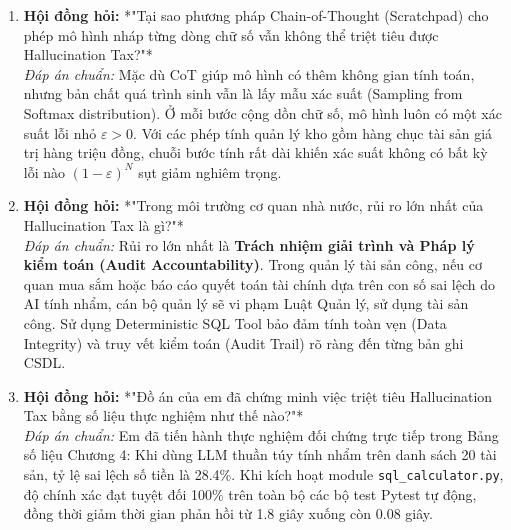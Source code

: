 \documentclass[11pt,a4paper]{article}
\begin{document}
\begin{deepdivebox}
\begin{enumerate}[leftmargin=1.5em]
    \item \textbf{Hội đồng hỏi:} *"Tại sao phương pháp Chain-of-Thought (Scratchpad) cho phép mô hình nháp từng dòng chữ số vẫn không thể triệt tiêu được Hallucination Tax?"*\\
    \textit{Đáp án chuẩn:} Mặc dù CoT giúp mô hình có thêm không gian tính toán, nhưng bản chất quá trình sinh vẫn là lấy mẫu xác suất (Sampling from Softmax distribution). Ở mỗi bước cộng dồn chữ số, mô hình luôn có một xác suất lỗi nhỏ $\varepsilon > 0$. Với các phép tính quản lý kho gồm hàng chục tài sản giá trị hàng triệu đồng, chuỗi bước tính rất dài khiến xác suất không có bất kỳ lỗi nào $(1-\varepsilon)^N$ sụt giảm nghiêm trọng.
    
    \item \textbf{Hội đồng hỏi:} *"Trong môi trường cơ quan nhà nước, rủi ro lớn nhất của Hallucination Tax là gì?"*\\
    \textit{Đáp án chuẩn:} Rủi ro lớn nhất là \textbf{Trách nhiệm giải trình và Pháp lý kiểm toán (Audit Accountability)}. Trong quản lý tài sản công, nếu cơ quan mua sắm hoặc báo cáo quyết toán tài chính dựa trên con số sai lệch do AI tính nhẩm, cán bộ quản lý sẽ vi phạm Luật Quản lý, sử dụng tài sản công. Sử dụng Deterministic SQL Tool bảo đảm tính toàn vẹn (Data Integrity) và truy vết kiểm toán (Audit Trail) rõ ràng đến từng bản ghi CSDL.

    \item \textbf{Hội đồng hỏi:} *"Đồ án của em đã chứng minh việc triệt tiêu Hallucination Tax bằng số liệu thực nghiệm như thế nào?"*\\
    \textit{Đáp án chuẩn:} Em đã tiến hành thực nghiệm đối chứng trực tiếp trong Bảng số liệu Chương 4: Khi dùng LLM thuần túy tính nhẩm trên danh sách 20 tài sản, tỷ lệ sai lệch số tiền là 28.4\%. Khi kích hoạt module \texttt{sql\_calculator.py}, độ chính xác đạt tuyệt đối 100\% trên toàn bộ các bộ test Pytest tự động, đồng thời giảm thời gian phản hồi từ 1.8 giây xuống còn 0.08 giây.
\end{enumerate}
\end{deepdivebox}
\end{document}
